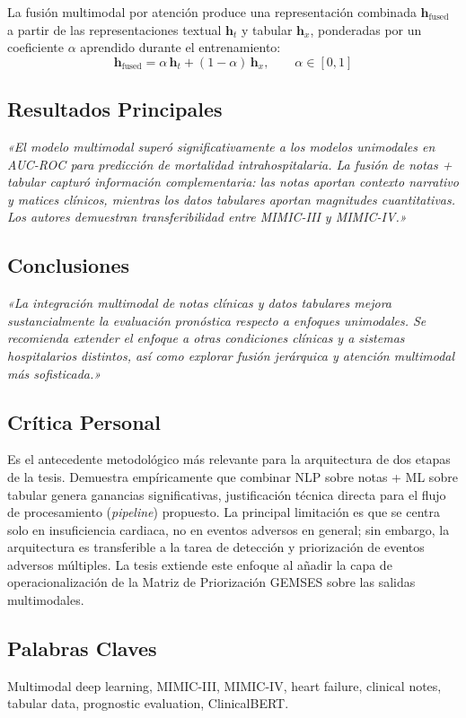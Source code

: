 \documentclass[11pt,a4paper]{article}
\newcommand{\cita}[1]{{\color{navy}\textit{«#1»}}}
\begin{document}
La fusión multimodal por atención produce una representación combinada $\mathbf{h}_{\text{fused}}$ a partir de las representaciones textual $\mathbf{h}_{t}$ y tabular $\mathbf{h}_{x}$, ponderadas por un coeficiente $\alpha$ aprendido durante el entrenamiento:
\begin{equation}
\mathbf{h}_{\text{fused}} = \alpha\,\mathbf{h}_{t} + (1-\alpha)\,\mathbf{h}_{x}, \qquad \alpha \in [0,1]
\end{equation}

\subsection{Resultados Principales}
\cita{El modelo multimodal superó significativamente a los modelos unimodales en AUC-ROC para predicción de mortalidad intrahospitalaria. La fusión de notas + tabular capturó información complementaria: las notas aportan contexto narrativo y matices clínicos, mientras los datos tabulares aportan magnitudes cuantitativas. Los autores demuestran transferibilidad entre MIMIC-III y MIMIC-IV.}

\subsection{Conclusiones}
\cita{La integración multimodal de notas clínicas y datos tabulares mejora sustancialmente la evaluación pronóstica respecto a enfoques unimodales. Se recomienda extender el enfoque a otras condiciones clínicas y a sistemas hospitalarios distintos, así como explorar fusión jerárquica y atención multimodal más sofisticada.}

\subsection{Crítica Personal}
Es el antecedente metodológico más relevante para la arquitectura de dos etapas de la tesis. Demuestra empíricamente que combinar NLP sobre notas + ML sobre tabular genera ganancias significativas, justificación técnica directa para el flujo de procesamiento (\textit{pipeline}) propuesto. La principal limitación es que se centra solo en insuficiencia cardiaca, no en eventos adversos en general; sin embargo, la arquitectura es transferible a la tarea de detección y priorización de eventos adversos múltiples. La tesis extiende este enfoque al añadir la capa de operacionalización de la Matriz de Priorización GEMSES sobre las salidas multimodales.

\subsection{Palabras Claves}
Multimodal deep learning, MIMIC-III, MIMIC-IV, heart failure, clinical notes, tabular data, prognostic evaluation, ClinicalBERT.
\end{document}
